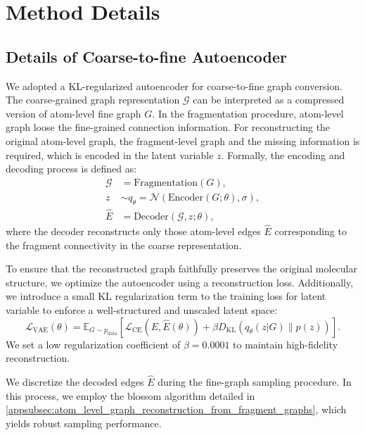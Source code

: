\section{Method Details}
\label{appsec:method_details}


\subsection{Details of Coarse-to-fine Autoencoder}
\label{appsubsec:detilas_of_coarse_to_fine_autoencoder}



We adopted a KL-regularized autoencoder for coarse-to-fine graph conversion.
The coarse-grained graph representation $\mathcal{G}$ can be interpreted as a compressed version of atom-level fine graph $G$.
In the fragmentation procedure, atom-level graph loose the fine-grained connection information.
For reconstructing the original atom-level graph, the fragment-level graph and the missing information is required, which is encoded in the latent variable $z$.
Formally, the encoding and decoding process is defined as:
\begin{align} \label{eq:definition of ae}
    \mathcal{G} &= \text{Fragmentation}(G), \nonumber \\
    z &\sim q_\theta =\mathcal{N}(\text{Encoder}(G;\theta), \sigma),  \\
    \hat{E} &= \text{Decoder}(\mathcal{G}, z; \theta), \nonumber
\end{align}
where the decoder reconstructs only those atom-level edges $\hat{E}$ corresponding to the fragment connectivity in the coarse representation.

To ensure that the reconstructed graph faithfully preserves the original molecular structure, we optimize the autoencoder using a reconstruction loss. 
Additionally, we introduce a small KL regularization term to the training loss for latent variable to enforce a well-structured and unscaled latent space:
\begin{equation} \label{eq:loss_ae_2}
    \mathcal{L}_{\text{VAE}}(\theta)
    = \mathbb{E}_{G \sim p_{\text{data}}} 
    \left[\mathcal{L}_{\text{CE}}\left(E, \hat{E}(\theta)\right)  
    + \beta D_{\text{KL}}\left( q_{\theta}(z | G) \parallel p(z) \right)\right].
\end{equation}
We set a low regularization coefficient of $\beta = 0.0001$ to maintain high-fidelity reconstruction.

We discretize the decoded edges $\hat{E}$ during the fine-graph sampling procedure. 
In this process, we employ the blossom algorithm detailed in \cref{appsubsec:atom_level_graph_reconstruction_from_fragment_graphs}, which yields robust sampling performance. 


